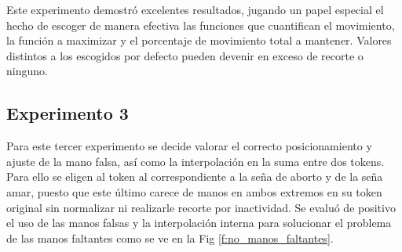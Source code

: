 Este experimento demostró excelentes resultados, jugando un papel especial el hecho de escoger de manera efectiva las funciones que cuantifican el movimiento, la función a maximizar y el porcentaje de movimiento total a mantener. Valores distintos a los escogidos por defecto pueden devenir en exceso de recorte o ninguno.

\subsection{Experimento 3}
Para este tercer experimento se decide valorar el correcto posicionamiento y ajuste de la mano falsa, así como la interpolación en la suma entre dos tokens. Para ello se eligen al token al correspondiente a la seña de aborto y de la seña amar, puesto que este último carece de manos en ambos extremos en su token original sin normalizar ni realizarle recorte por inactividad. Se evaluó de positivo el uso de las manos falsas y la interpolación interna para solucionar el problema de las manos faltantes como se ve en la Fig \ref{f:no_manos_faltantes}.

